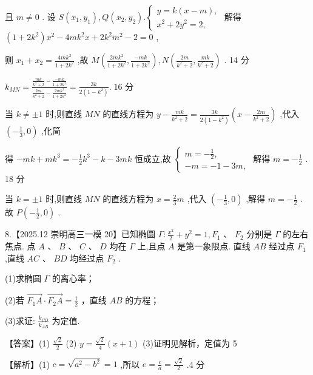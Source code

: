 \documentclass[10pt]{article}
\begin{document}
且 \(m \neq  0\) . 设 \(S\left( {{x}_{1},{y}_{1}}\right) ,Q\left( {{x}_{2},{y}_{2}}\right) .\left\{  \begin{array}{l} y = k\left( {x - m}\right) , \\  {x}^{2} + 2{y}^{2} = 2, \end{array}\right.\) 解得 \(\left( {1 + 2{k}^{2}}\right) {x}^{2} - {4m}{k}^{2}x + 2{k}^{2}{m}^{2} - 2 = 0\) ,

则 \({x}_{1} + {x}_{2} = \frac{{4m}{k}^{2}}{1 + 2{k}^{2}}\) ,故 \(M\left( {\frac{{2m}{k}^{2}}{1 + 2{k}^{2}},\frac{-{mk}}{1 + 2{k}^{2}}}\right) ,N\left( {\frac{2m}{{k}^{2} + 2},\frac{mk}{{k}^{2} + 2}}\right)\) . 14 分

\({k}_{MN} = \frac{\frac{mk}{{k}^{2} + 2} - \frac{-{mk}}{1 + 2{k}^{2}}}{\frac{2m}{{k}^{2} + 2} - \frac{{2m}{k}^{2}}{1 + 2{k}^{2}}} = \frac{3k}{2\left( {1 - {k}^{2}}\right) }.\;{16}\) 分

当 \(k \neq   \pm  1\) 时,则直线 \({MN}\) 的直线方程为 \(y - \frac{mk}{{k}^{2} + 2} = \frac{3k}{2\left( {1 - {k}^{2}}\right) }\left( {x - \frac{2m}{{k}^{2} + 2}}\right)\) ,代入 \(\left( {-\frac{1}{3},0}\right)\) ,化简

得 \(- {mk} + m{k}^{3} =  - \frac{1}{2}{k}^{3} - k - {3mk}\) 恒成立,故 \(\left\{  \begin{array}{l} m =  - \frac{1}{2}, \\   - m =  - 1 - {3m}, \end{array}\right.\) 解得 \(m =  - \frac{1}{2}\) . 18 分

当 \(k =  \pm  1\) 时,则直线 \({MN}\) 的直线方程为 \(x = \frac{2}{3}m\) ,代入 \(\left( {-\frac{1}{3},0}\right)\) ,解得 \(m =  - \frac{1}{2}\) . 故 \(P\left( {-\frac{1}{2},0}\right)\) .

8.【2025.12 崇明高三一模 20】已知椭圆 \(\Gamma  : \frac{{x}^{2}}{2} + {y}^{2} = 1,{F}_{1}\text{ 、 }{F}_{2}\) 分别是 \(\Gamma\) 的左右焦点. 点 \(A\) 、 \(B\text{ 、 }C\text{ 、 }D\) 均在 \(\Gamma\) 上,且点 \(A\) 是第一象限点. 直线 \({AB}\) 经过点 \({F}_{1}\) ,直线 \({AC}\text{ 、 }{BD}\) 均经过点 \({F}_{2}\) .

(1)求椭圆 \(\Gamma\) 的离心率；

(2)若 \(\overrightarrow{{F}_{1}A} \cdot  \overrightarrow{{F}_{2}A} = \frac{1}{2}\) ，直线 \({AB}\) 的方程；

(3)求证: \(\frac{{k}_{CD}}{{k}_{AB}}\) 为定值.

【答案】(1) \(\frac{\sqrt{2}}{2}\) (2) \(y = \frac{\sqrt{2}}{4}\left( {x + 1}\right)\) (3)证明见解析，定值为 5

【解析】(1) \(c = \sqrt{{a}^{2} - {b}^{2}} = 1\) ,所以 \(e = \frac{c}{a} = \frac{\sqrt{2}}{2}\) .4 分
\end{document}

